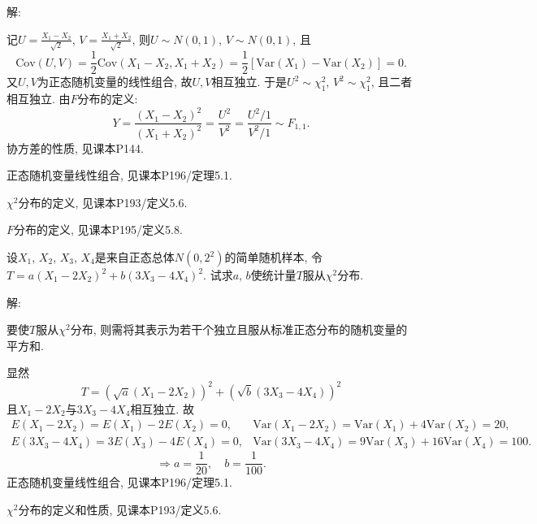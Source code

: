 \documentclass[standard]{ExBook}
\renewenvironment{shaded}{%
  \def\FrameCommand{\fboxsep=\FrameSep \colorbox{shadecolor}}%
  \MakeFramed{\advance\hsize-\width \FrameRestore}%
}{%
  \endMakeFramed
}
\begin{document}
\begin{qitems}
\vspace{\dimexpr2.5cm-5em\relax}

解:

记$U=\frac{X_1-X_2}{\sqrt{2}}$, $V=\frac{X_1+X_2}{\sqrt{2}}$, 则$U\sim N(0,1)$, $V\sim N(0,1)$, 且
$$
\mathrm{Cov}(U,V)=\frac{1}{2}\mathrm{Cov}(X_1-X_2,X_1+X_2)=\frac{1}{2}\left[\mathrm{Var}(X_1)-\mathrm{Var}(X_2)\right]=0.
$$
又$U,V$为正态随机变量的线性组合, 故$U,V$相互独立. 于是$U^2\sim\chi_1^2$, $V^2\sim\chi_1^2$, 且二者相互独立. 由$F$分布的定义:
$$
Y=\frac{(X_1-X_2)^2}{(X_1+X_2)^2}
=\frac{U^2}{V^2}
=\frac{U^2/1}{V^2/1}\sim F_{1,1}.
$$
\textcolor{themeColor}{\selectfont {} 协方差的性质, 见课本P144.}

\textcolor{themeColor}{\selectfont {} 正态随机变量线性组合, 见课本P196/定理5.1.}

\textcolor{themeColor}{\selectfont {} $\chi^2$分布的定义, 见课本P193/定义5.6.}

\textcolor{themeColor}{\selectfont {} $F$分布的定义, 见课本P195/定义5.8.}

\vspace{2.5cm-5em}

    \begin{bbox}
    \begin{shaded}
        \qitem
设$X_1$, $X_2$, $X_3$, $X_4$是来自正态总体$N(0,2^2)$的简单随机样本, 令$T=a(X_1-2X_2)^2+b(3X_3-4X_4)^2$. 试求$a$, $b$使统计量$T$服从$\chi^2$分布.
    \end{shaded}
    \end{bbox}

\vspace{\dimexpr2.5cm-5em\relax}

解: 

要使$T$服从$\chi^2$分布, 则需将其表示为若干个独立且服从标准正态分布的随机变量的平方和. 

显然
$$
T = \left(\sqrt{a}(X_1-2X_2)\right)^2 + \left(\sqrt{b}(3X_3-4X_4)\right)^2
$$
且$X_1-2X_2$与$3X_3-4X_4$相互独立. 故
$$
\begin{array}{ll}
E(X_1-2X_2)=E(X_1)-2E(X_2)=0,
&
\mathrm{Var}(X_1-2X_2)=\mathrm{Var}(X_1)+4\mathrm{Var}(X_2)=20,\\[0.5em]
E(3X_3-4X_4)=3E(X_3)-4E(X_4)=0,
&
\mathrm{Var}(3X_3-4X_4)=9\mathrm{Var}(X_3)+16\mathrm{Var}(X_4)=100.
\end{array}
$$
$$
\Longrightarrow
a=\frac{1}{20},\quad b=\frac{1}{100}.
$$
\textcolor{themeColor}{\selectfont {} 正态随机变量线性组合, 见课本P196/定理5.1.}

\textcolor{themeColor}{\selectfont {} $\chi^2$分布的定义和性质, 见课本P193/定义5.6.}


\end{qitems}
\end{document}
